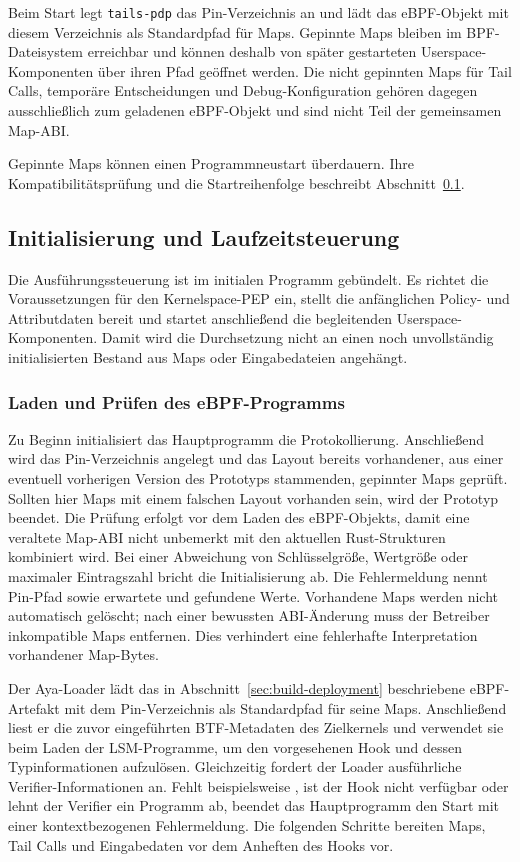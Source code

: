 Beim Start legt \texttt{tails-pdp} das Pin-Verzeichnis  an und lädt das eBPF-Objekt mit diesem Verzeichnis als Standardpfad für Maps. Gepinnte Maps bleiben im BPF-Dateisystem erreichbar und können deshalb von später gestarteten Userspace-Komponenten über ihren Pfad geöffnet werden. Die nicht gepinnten Maps für Tail Calls, temporäre Entscheidungen und Debug-Konfiguration gehören dagegen ausschließlich zum geladenen eBPF-Objekt und sind nicht Teil der gemeinsamen Map-ABI.

Gepinnte Maps können einen Programmneustart überdauern. Ihre Kompatibilitätsprüfung und die Startreihenfolge beschreibt Abschnitt~\ref{sec:initialisierung}.

\subsection{Initialisierung und Laufzeitsteuerung}\label{sec:initialisierung}
Die Ausführungssteuerung ist im initialen Programm  gebündelt. Es richtet die Voraussetzungen für den Kernelspace-PEP ein, stellt die anfänglichen Policy- und Attributdaten bereit und startet anschließend die begleitenden Userspace-Komponenten. Damit wird die Durchsetzung nicht an einen noch unvollständig initialisierten Bestand aus Maps oder Eingabedateien angehängt.

\subsubsection{Laden und Prüfen des eBPF-Programms}
Zu Beginn initialisiert das Hauptprogramm die Protokollierung. Anschließend wird das Pin-Verzeichnis  angelegt und das Layout bereits vorhandener, aus einer eventuell vorherigen Version des Prototyps stammenden, gepinnter Maps geprüft. Sollten hier Maps mit einem falschen Layout vorhanden sein, wird der Prototyp beendet. Die Prüfung erfolgt vor dem Laden des eBPF-Objekts, damit eine veraltete Map-ABI nicht unbemerkt mit den aktuellen Rust-Strukturen kombiniert wird. Bei einer Abweichung von Schlüsselgröße, Wertgröße oder maximaler Eintragszahl bricht die Initialisierung ab. Die Fehlermeldung nennt Pin-Pfad sowie erwartete und gefundene Werte. Vorhandene Maps werden nicht automatisch gelöscht; nach einer bewussten ABI-Änderung muss der Betreiber inkompatible Maps entfernen. Dies verhindert eine fehlerhafte Interpretation vorhandener Map-Bytes.

Der Aya-Loader lädt das in Abschnitt~\ref{sec:build-deployment} beschriebene eBPF-Artefakt mit dem Pin-Verzeichnis als Standardpfad für seine Maps. Anschließend liest er die zuvor eingeführten BTF-Metadaten des Zielkernels und verwendet sie beim Laden der LSM-Programme, um den vorgesehenen Hook und dessen Typinformationen aufzulösen. Gleichzeitig fordert der Loader ausführliche Verifier-Informationen an. Fehlt beispielsweise , ist der Hook nicht verfügbar oder lehnt der Verifier ein Programm ab, beendet das Hauptprogramm den Start mit einer kontextbezogenen Fehlermeldung. Die folgenden Schritte bereiten Maps, Tail Calls und Eingabedaten vor dem Anheften des Hooks vor.


